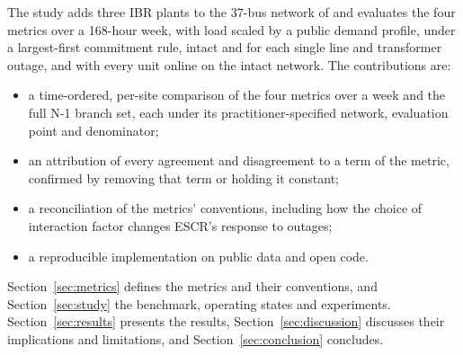 The study adds three IBR plants to the 37-bus network of \cite{gloverPSAD} and evaluates the four metrics over
a 168-hour week, with load scaled by a public demand profile, under a largest-first commitment rule,
intact and for each single line and transformer outage, and with every unit online on the intact
network. The contributions are:
\begin{itemize}
  \item a time-ordered, per-site comparison of the four metrics over a week and the full N-1 branch
        set, each under its practitioner-specified network, evaluation point and denominator;
  \item an attribution of every agreement and disagreement to a term of the metric, confirmed by
        removing that term or holding it constant;
  \item a reconciliation of the metrics' conventions, including how the choice of interaction
        factor changes ESCR's response to outages;
  \item a reproducible implementation on public data and open code.
\end{itemize}

Section~\ref{sec:metrics} defines the metrics and their conventions, and Section~\ref{sec:study}
the benchmark, operating states and experiments. Section~\ref{sec:results} presents the results,
Section~\ref{sec:discussion} discusses their implications and limitations, and
Section~\ref{sec:conclusion} concludes.
